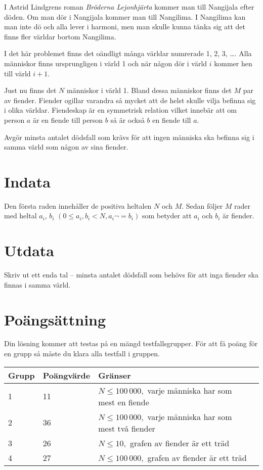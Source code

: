\def\version{1}
I Astrid Lindgrens roman \emph{Bröderna Lejonhjärta} kommer man till Nangijala efter döden. Om man dör i Nangijala kommer man till Nangilima. I Nangilima kan man inte dö och alla lever i harmoni, men man skulle kunna tänka sig att det finns fler världar bortom Nangilima.

I det här problemet finns det oändligt många världar numrerade 1, 2, 3, \dots. Alla människor finns ursprungligen i värld 1 och när någon dör i värld $i$ kommer hen till värld $i+1$.

Just nu finns det $N$ människor i värld 1. Bland dessa människor finns det $M$ par av fiender. Fiender ogillar varandra så mycket att de helst skulle vilja befinna sig i olika världar. Fiendeskap är en symmetrisk relation vilket innebär att om person $a$ är en fiende till person $b$ så är också $b$ en fiende till $a$.

Avgör minsta antalet dödsfall som krävs för att ingen människa ska befinna sig i samma värld som någon av sina fiender.

\section*{Indata}
Den första raden innehåller de positiva heltalen $N$ och $M$.
Sedan följer $M$ rader med heltal $a_i$, $b_i$ $(0 \le a_i, b_i < N, a_i \neg = b_i)$ som betyder att $a_i$ och $b_i$ är fiender.

\section*{Utdata}
Skriv ut ett enda tal -- minsta antalet dödsfall som behövs för att inga fiender ska finnas i samma värld.

\section*{Poängsättning}
Din lösning kommer att testas på en mängd testfallsgrupper. För att få poäng för en grupp
så måste du klara alla testfall i gruppen.

\noindent
\begin{tabular}{| l | l | l | l |}
\hline
Grupp & Poängvärde & Gränser \\ \hline
	1     & 11 & $N \le 100\,000,$ varje människa har som mest en fiende \\ \hline
	2     & 36 & $N \le 100\,000,$ varje människa har som mest två fiender  \\ \hline
	3     & 26 & $N \le 10,$ grafen av fiender är ett träd \\ \hline
	4     & 27 & $N \le 100\,000,$ grafen av fiender är ett träd \\ \hline
\end{tabular}
